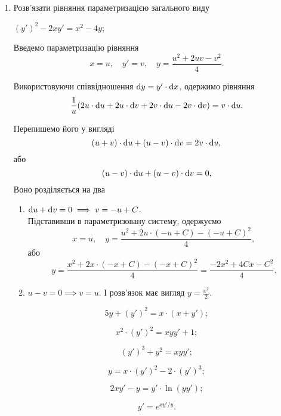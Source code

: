 \begin{enumerate}
\item Розв’язати рівняння параметризацією загального виду
\begin{example}
	$(y')^2 - 2 x y' = x^2 - 4y$;
\end{example}
\begin{solution}
	Введемо параметризацію рівняння \[x = u, \quad y' = v, \quad y = \frac {u^2 + 2 u v - v^2}{4}.\] 

	Використовуючи співвідношення $\mathop{}\!\mathrm{d} y = y' \cdot \mathop{}\!\mathrm{d} x$, одержимо рівняння
	\[ \frac1u (2u \cdot \mathop{}\!\mathrm{d} u + 2 u \cdot \mathop{}\!\mathrm{d} v + 2 v \cdot \mathop{}\!\mathrm{d} u - 2 v \cdot \mathop{}\!\mathrm{d} v) = v \cdot \mathop{}\!\mathrm{d} u.\]

	Перепишемо його у вигляді \[ (u+v)\cdot\mathop{}\!\mathrm{d} u+(u-v)\cdot\mathop{}\!\mathrm{d} v=2v\cdot\mathop{}\!\mathrm{d} u,\] або \[ (u-v)\cdot\mathop{}\!\mathrm{d} u+(u-v)\cdot\mathop{}\!\mathrm{d} v=0,\]
	Воно розділяється на два 
	\begin{enumerate}
		\item $\mathop{}\!\mathrm{d} u + \mathop{}\!\mathrm{d} v = 0 \implies v = - u + C$. \\

		Підставивши в параметризовану систему, одержуємо \[x = u, \quad y = \frac{u^2+2u\cdot(-u+C)-(-u+C)^2}{4},\] або \[y = \frac{x^2+2x\cdot(-x+C)-(-x+C)^2}{4} = \frac{-2x^2+4Cx-C^2}{4}.\]
		\item $u - v = 0 \implies v = u$. І розв’язок має вигляд $y = \frac{x^2}{2}$.
	\end{enumerate}
\end{solution}

\begin{multicols}{2}
\begin{problem}
	\[5y+(y')^2=x\cdot(x+y');\]
\end{problem}
\begin{problem}
	\[x^2\cdot(y')^2=xyy'+1;\]
\end{problem}
\begin{problem}
	\[(y')^3+y^2=xyy';\]
\end{problem}
\begin{problem}
	\[y=x\cdot(y')^2-2\cdot(y')^3;\]
\end{problem}
\begin{problem}
	\[2xy'-y=y'\cdot\ln(yy');\]
\end{problem}
\begin{problem}
	\[y'=e^{xy'/y}.\]
\end{problem}
\end{multicols}


\end{enumerate}
